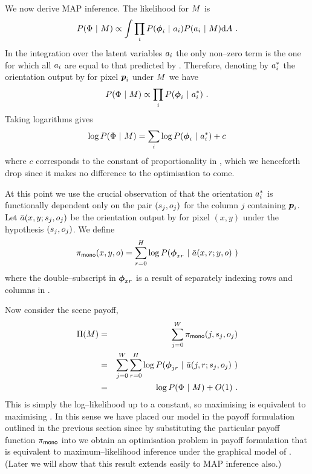 We now derive MAP inference. The likelihood for $\Scene$ is
\begin{equation}
  \label{eq:photometric-lik-full}
  P(\Features ~|~ \Scene) \propto 
  \int
    \prod_i P(\Feature_i ~|~ \Orient_i) 
            P(\Orient_i ~|~ \Scene)
  \intd \Orients ~.
\end{equation}
In the integration over the latent variables $\Orient_i$ the only
non--zero term is the one for which all $\Orient_i$ are equal to that
predicted by . Therefore, denoting by
$\PredictedOrient_i$ the orientation output by
 for pixel $\Pixel_i$ under $\Scene$ we
have
\begin{equation}
  \label{eq:photometric-lik}
  P(\Features ~|~ \Scene) \propto
    \prod_i P(\Feature_i ~|~ \PredictedOrient_i) ~.
\end{equation}
Taking logarithms gives
\begin{equation}
  \label{eq:photometric-loglik}
  \log P(\Features ~|~ \Scene) =
    \sum_i \log P(\Feature_i ~|~ \Orient_i^*) + c
\end{equation}
where $c$ corresponds to the constant of proportionality in
, which we henceforth drop since it makes no
difference to the optimisation to come. 

At this point we use the crucial observation of
 that the orientation
$\PredictedOrient_i$ is functionally dependent only on the pair
$(\seam_j,\WallOrient_j)$ for the column $j$ containing
$\Pixel_i$. Let $\ComputedOrient(x,y;\seam_j,\WallOrient_j)$ be the
orientation output by  for pixel $(x,y)$
under the hypothesis $(\seam_j,\WallOrient_j)$. We define
\begin{equation}
  \label{eq:mono-payoffs}
  \MonoPayoff(x,y,\WallOrient) = \sum_{r=0}^H \log 
    P(\Feature_{xr} ~|~ \ComputedOrient(x,r;y,\WallOrient)~)
\end{equation}
where the double--subscript in $\Feature_{xr}$ is a result of
separately indexing rows and columns in . 

Now consider the scene payoff,
\begin{eqnarray}
  \ScenePayoff(\Scene) &=& 
    \sum_{j=0}^W \MonoPayoff(j, \seam_j, \WallOrient_j) \\
  &=& 
    \sum_{j=0}^W \sum_{r=0}^H \log
      P(\Feature_{jr} ~|~ \ComputedOrient(j,r;\seam_j,\WallOrient_j)~)\\
  &=&
    \log P(\Features ~|~ \Scene) + O(1)  ~.
    \label{eq:photometric-in-scene-payoff}
\end{eqnarray}
This is simply the log--likelihood  up to a
constant, so maximising  is
equivalent to maximising . In this sense we
have placed our model in the payoff formulation outlined in the
previous section since by substituting the particular payoff function
$\MonoPayoff$ into  we obtain an optimisation
problem in payoff formulation that is equivalent to
maximum--likelihood inference under the graphical model of
. (Later we will show that this result extends
easily to MAP inference also.)

